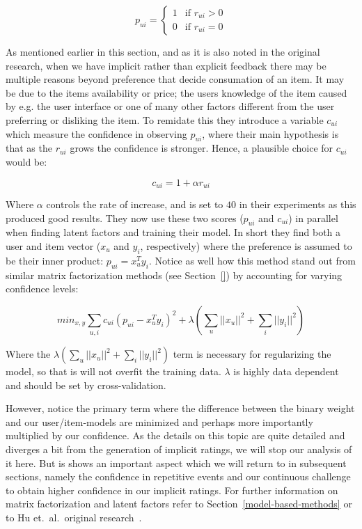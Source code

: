 \begin{equation}
  p_{ui} =
  \begin{cases}
    1 & \text{if $r_{ui} > 0$} \\
    0 & \text{if $r_{ui} = 0$}
  \end{cases}
\end{equation}

As mentioned earlier in this section, and as it is also noted in the original
research, when we have implicit rather than explicit feedback there may be
multiple reasons beyond preference that decide consumation of an item. It may
be due to the items availability or price; the users knowledge of the item
caused by e.g. the user interface or one of many other factors different from
the user preferring or disliking the item. To remidate this they introduce a
variable $c_{ui}$ which measure the confidence in observing $p_{ui}$, where
their main hypothesis is that as the $r_{ui}$ grows the confidence is stronger.
Hence, a plausible choice for $c_{ui}$ would be:

\begin{equation}
c_{ui} = 1 + \alpha r_{ui}
\end{equation}

Where $\alpha$ controls the rate of increase, and is set to $40$ in their
experiments as this produced good results. They now use these two scores
($p_{ui}$ and $c_{ui}$) in parallel when finding latent factors and training
their model. In short they find both a user and item vector ($x_u$ and $y_i$,
respectively) where the preference is assumed to be their inner product: $p_{ui}
= x_{u}^{T} y_{i}$. Notice as well how this method stand out from similar
matrix factorization methods (see Section~\ref{}) by accounting for varying
confidence levels:

\begin{equation}
  min_{x,y} \sum _{u,i} c_{ui} (p_{ui} - x_{u}^{T} y_i)^2 + \lambda (\sum _{u}
  || x_u ||^2 + \sum_{i} || y_i ||^2)
\end{equation}

Where the $\lambda (\sum _{u} || x_u ||^2 + \sum_{i} || y_i ||^2)$ term is
necessary for regularizing the model, so that is will not overfit the
training data. $\lambda$ is highly data dependent and should be set by
cross-validation.

However, notice the primary term where the difference between the binary weight
and our user/item-models are minimized and perhaps more importantly multiplied
by our confidence. As the details on this topic are quite detailed and diverges
a bit from the generation of implicit ratings, we will stop our analysis of it
here. But is shows an important aspect which we will return to in subsequent
sections, namely the confidence in repetitive events and our continuous
challenge to obtain higher confidence in our implicit ratings. For further
information on matrix factorization and latent factors refer to
Section~\ref{model-based-methods} or to Hu et.\ al.\ original
research~\cite{Hu2008}.

